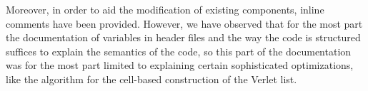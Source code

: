 Moreover, in order to aid the modification of existing components, inline comments have been provided. However, we have observed that for the most part the documentation of variables in header files and the way the code is structured suffices to explain the semantics of the code, so this part of the documentation was for the most part limited to explaining certain sophisticated optimizations, like the algorithm for the cell-based construction of the Verlet list.
